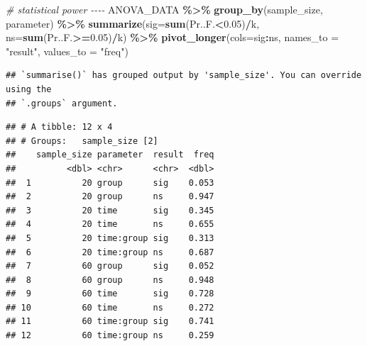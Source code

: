 \documentclass[
]{article}
\newenvironment{Shaded}{\begin{snugshade}}{\end{snugshade}}
\newcommand{\AttributeTok}[1]{\textcolor[rgb]{0.13,0.29,0.53}{#1}}
\newcommand{\CommentTok}[1]{\textcolor[rgb]{0.56,0.35,0.01}{\textit{#1}}}
\newcommand{\FloatTok}[1]{\textcolor[rgb]{0.00,0.00,0.81}{#1}}
\newcommand{\FunctionTok}[1]{\textcolor[rgb]{0.13,0.29,0.53}{\textbf{#1}}}
\newcommand{\NormalTok}[1]{#1}
\newcommand{\SpecialCharTok}[1]{\textcolor[rgb]{0.81,0.36,0.00}{\textbf{#1}}}
\newcommand{\StringTok}[1]{\textcolor[rgb]{0.31,0.60,0.02}{#1}}
\begin{document}
\begin{Shaded}
\begin{Highlighting}[]
\CommentTok{\# statistical power {-}{-}{-}{-}}
\NormalTok{ANOVA\_DATA }\SpecialCharTok{\%\textgreater{}\%} \FunctionTok{group\_by}\NormalTok{(sample\_size, parameter) }\SpecialCharTok{\%\textgreater{}\%}
  \FunctionTok{summarize}\NormalTok{(}\AttributeTok{sig=}\FunctionTok{sum}\NormalTok{(Pr..F.}\SpecialCharTok{\textless{}}\FloatTok{0.05}\NormalTok{)}\SpecialCharTok{/}\NormalTok{k,}
            \AttributeTok{ns=}\FunctionTok{sum}\NormalTok{(Pr..F.}\SpecialCharTok{\textgreater{}=}\FloatTok{0.05}\NormalTok{)}\SpecialCharTok{/}\NormalTok{k) }\SpecialCharTok{\%\textgreater{}\%} 
  \FunctionTok{pivot\_longer}\NormalTok{(}\AttributeTok{cols=}\NormalTok{sig}\SpecialCharTok{:}\NormalTok{ns, }\AttributeTok{names\_to =} \StringTok{"result"}\NormalTok{, }\AttributeTok{values\_to =} \StringTok{"freq"}\NormalTok{)}
\end{Highlighting}
\end{Shaded}

\begin{verbatim}
## `summarise()` has grouped output by 'sample_size'. You can override using the
## `.groups` argument.
\end{verbatim}

\begin{verbatim}
## # A tibble: 12 x 4
## # Groups:   sample_size [2]
##    sample_size parameter  result  freq
##          <dbl> <chr>      <chr>  <dbl>
##  1          20 group      sig    0.053
##  2          20 group      ns     0.947
##  3          20 time       sig    0.345
##  4          20 time       ns     0.655
##  5          20 time:group sig    0.313
##  6          20 time:group ns     0.687
##  7          60 group      sig    0.052
##  8          60 group      ns     0.948
##  9          60 time       sig    0.728
## 10          60 time       ns     0.272
## 11          60 time:group sig    0.741
## 12          60 time:group ns     0.259
\end{verbatim}
\end{document}
